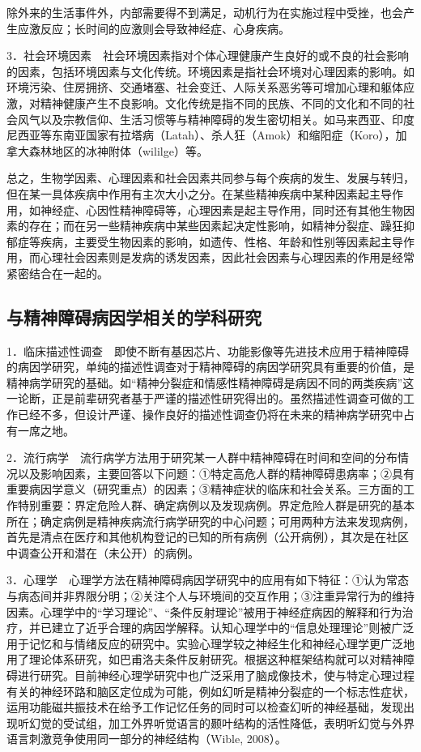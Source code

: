 除外来的生活事件外，内部需要得不到满足，动机行为在实施过程中受挫，也会产生应激反应；长时间的应激则会导致神经症、心身疾病。

3．社会环境因素　社会环境因素指对个体心理健康产生良好的或不良的社会影响的因素，包括环境因素与文化传统。环境因素是指社会环境对心理因素的影响。如环境污染、住房拥挤、交通堵塞、社会变迁、人际关系恶劣等可增加心理和躯体应激，对精神健康产生不良影响。文化传统是指不同的民族、不同的文化和不同的社会风气以及宗教信仰、生活习惯等与精神障碍的发生密切相关。如马来西亚、印度尼西亚等东南亚国家有拉塔病（Latah）、杀人狂（Amok）和缩阳症（Koro），加拿大森林地区的冰神附体（wililge）等。

总之，生物学因素、心理因素和社会因素共同参与每个疾病的发生、发展与转归，但在某一具体疾病中作用有主次大小之分。在某些精神疾病中某种因素起主导作用，如神经症、心因性精神障碍等，心理因素是起主导作用，同时还有其他生物因素的存在；而在另一些精神疾病中某些因素起决定性影响，如精神分裂症、躁狂抑郁症等疾病，主要受生物因素的影响，如遗传、性格、年龄和性别等因素起主导作用，而心理社会因素则是发病的诱发因素，因此社会因素与心理因素的作用是经常紧密结合在一起的。

\subsection{与精神障碍病因学相关的学科研究}

1．临床描述性调查　即使不断有基因芯片、功能影像等先进技术应用于精神障碍的病因学研究，单纯的描述性调查对于精神障碍的病因学研究具有重要的价值，是精神病学研究的基础。如“精神分裂症和情感性精神障碍是病因不同的两类疾病”这一论断，正是前辈研究者基于严谨的描述性研究得出的。虽然描述性调查可做的工作已经不多，但设计严谨、操作良好的描述性调查仍将在未来的精神病学研究中占有一席之地。

2．流行病学　流行病学方法用于研究某一人群中精神障碍在时间和空间的分布情况以及影响因素，主要回答以下问题：①特定高危人群的精神障碍患病率；②具有重要病因学意义（研究重点）的因素；③精神症状的临床和社会关系。三方面的工作特别重要：界定危险人群、确定病例以及发现病例。界定危险人群是研究的基本所在；确定病例是精神疾病流行病学研究的中心问题；可用两种方法来发现病例，首先是清点在医疗和其他机构登记的已知的所有病例（公开病例），其次是在社区中调查公开和潜在（未公开）的病例。

3．心理学　心理学方法在精神障碍病因学研究中的应用有如下特征：①认为常态与病态间并非界限分明；②关注个人与环境间的交互作用；③注重异常行为的维持因素。心理学中的“学习理论”、“条件反射理论”被用于神经症病因的解释和行为治疗，并已建立了近乎合理的病因学解释。认知心理学中的“信息处理理论”则被广泛用于记忆和与情绪反应的研究中。实验心理学较之神经生化和神经心理学更广泛地用了理论体系研究，如巴甫洛夫条件反射研究。根据这种框架结构就可以对精神障碍进行研究。目前神经心理学研究中也广泛采用了脑成像技术，使与特定心理过程有关的神经环路和脑区定位成为可能，例如幻听是精神分裂症的一个标志性症状，运用功能磁共振技术在给予工作记忆任务的同时可以检查幻听的神经基础，发现出现听幻觉的受试组，加工外界听觉语言的颞叶结构的活性降低，表明听幻觉与外界语言刺激竞争使用同一部分的神经结构（Wible,
2008）。

